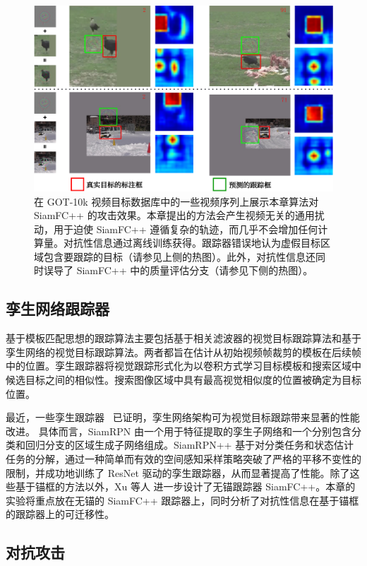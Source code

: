 \begin{figure}[t]
\centering
\includegraphics[width=1.0\textwidth]{Img/attack/1_v9.pdf}
\caption{在 GOT-10k 视频目标数据库中的一些视频序列上展示本章算法对 SiamFC++ 的攻击效果。本章提出的方法会产生视频无关的通用扰动，用于迫使 SiamFC++ 遵循复杂的轨迹，而几乎不会增加任何计算量。对抗性信息通过离线训练获得。跟踪器错误地认为虚假目标区域包含要跟踪的目标（请参见上侧的热图）。此外，对抗性信息还同时误导了 SiamFC++ 中的质量评估分支（请参见下侧的热图）。} 
\label{fig:1}
\end{figure}

\subsection{孪生网络跟踪器}

基于模板匹配思想的跟踪算法主要包括基于相关滤波器的视觉目标跟踪算法和基于孪生网络的视觉目标跟踪算法。两者都旨在估计从初始视频帧裁剪的模板在后续帧中的位置。孪生跟踪器将视觉跟踪形式化为以卷积方式学习目标模板和搜索区域中候选目标之间的相似性。搜索图像区域中具有最高视觉相似度的位置被确定为目标位置。

最近，一些孪生跟踪器~\cite{SiamRPN,SiamRPN++,SiamFC++} 已证明，孪生网络架构可为视觉目标跟踪带来显著的性能改进。
具体而言，SiamRPN \cite{SiamRPN} 由一个用于特征提取的孪生子网络和一个分别包含分类和回归分支的区域生成子网络组成。SiamRPN++ \cite{SiamRPN++} 基于对分类任务和状态估计任务的分解，通过一种简单而有效的空间感知采样策略突破了严格的平移不变性的限制，并成功地训练了 ResNet 驱动的孪生跟踪器，从而显著提高了性能。除了这些基于锚框的方法以外，Xu 等人 \cite{SiamFC++} 进一步设计了无锚跟踪器 SiamFC++。本章的实验将重点放在无锚的 SiamFC++ 跟踪器上，同时分析了对抗性信息在基于锚框的跟踪器上的可迁移性。

\subsection{对抗攻击}

